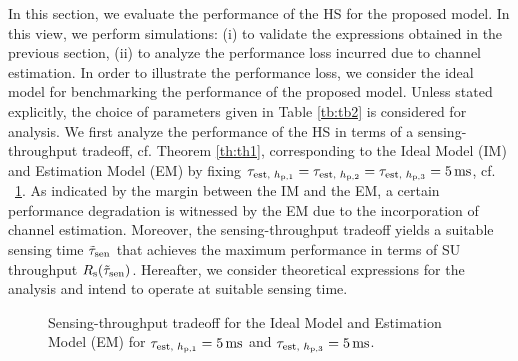 In this section, we evaluate the performance of the HS for the proposed model. In this view, we perform simulations: (i) to validate the expressions obtained in the previous section, (ii) to analyze the performance loss incurred due to channel estimation. In order to illustrate the performance loss, we consider the ideal model for benchmarking the performance of the proposed model. Unless stated explicitly, the choice of parameters given in Table \ref{tb:tb2} is considered for analysis. We first analyze the performance of the HS in terms of a sensing-throughput tradeoff, cf. Theorem \ref{th:th1}, corresponding to the Ideal Model (IM) and Estimation Model (EM) by fixing $\tau_{\text{est, $h_{\text{p,1}}$}} = \tau_{\text{est, $h_{\text{p,2}}$}} =  \tau_{\text{est, $h_{\text{p,3}}$}} = \SI{5}{ms}$, cf. \figurename~\ref{fig:STT}. As indicated by the margin between the IM and the EM, a certain performance degradation is witnessed by the EM due to the incorporation of channel estimation. Moreover, the sensing-throughput tradeoff yields a suitable sensing time $\tilde{\tau}_{\text{sen}}$ that achieves the maximum performance in terms of SU throughput $R_{\text{s}}(\tilde{\tau}_{\text{sen}})$. Hereafter, we consider theoretical expressions for the analysis and intend to operate at suitable sensing time. 
\begin{figure}

\centering
{}
\caption{Sensing-throughput tradeoff for the Ideal Model and Estimation Model (EM) for $\tau_{\text{est, $h_{\text{p,1}}$}} = \SI{5}{ms}$ and $\tau_{\text{est, $h_{\text{p,3}}$}} = \SI{5}{ms}$.}
\label{fig:STT}
\end{figure}

